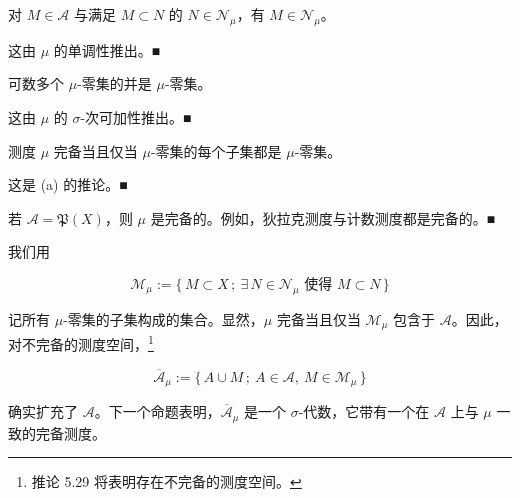 \begin{remark}

\begin{items}
\item

对 $ M \in \mathcal{A} $ 与满足 $ M \subset N $ 的 $ N \in \mathcal{N}_\mu $，有 $ M \in \mathcal{N}_\mu $。

\proofhead
这由 $ \mu $ 的单调性推出。\nobreak\hspace{0.35em}■
\item

可数多个 $ \mu $-零集的并是 $ \mu $-零集。

\proofhead
这由 $ \mu $ 的 $ \sigma $-次可加性推出。\nobreak\hspace{0.35em}■
\item

测度 $ \mu $ 完备当且仅当 $ \mu $-零集的每个子集都是 $ \mu $-零集。

\proofhead
这是 (a) 的推论。\nobreak\hspace{0.35em}■
\item

若 $ \mathcal{A} = \mathfrak{P}(X) $，则 $ \mu $ 是完备的。例如，狄拉克测度与计数测度都是完备的。\nobreak\hspace{0.35em}■

\end{items}

我们用

\[
\mathcal{M}_\mu := \{\, M \subset X \,; \ \exists\, N \in \mathcal{N}_\mu \text{ 使得 } M \subset N \,\}
\]

记所有 $ \mu $-零集的子集构成的集合。显然，$ \mu $ 完备当且仅当 $ \mathcal{M}_\mu $ 包含于 $ \mathcal{A} $。因此，对不完备的测度空间，\footnote{推论 5.29 将表明存在不完备的测度空间。}

\[
\overline{\mathcal{A}}_\mu := \{\, A \cup M \,; \ A \in \mathcal{A},\ M \in \mathcal{M}_\mu \,\}
\]

确实扩充了 $ \mathcal{A} $。下一个命题表明，$ \overline{\mathcal{A}}_\mu $ 是一个 $ \sigma $-代数，它带有一个在 $ \mathcal{A} $ 上与 $ \mu $ 一致的完备测度。

\end{remark}

